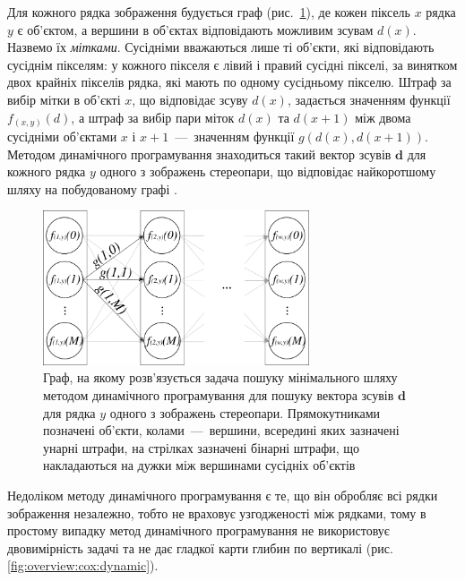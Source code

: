 Для кожного рядка зображення будується граф
(рис.~\ref{fig:dynamic:programming:graph}),
де кожен піксель $x$ рядка $y$ є об'єктом,
а вершини в об'єктах відповідають можливим зсувам $d \left(x \right)$.
Назвемо їх \textit{мітками}.
Сусідніми вважаються лише ті об'єкти, які відповідають сусіднім пікселям:
у кожного пікселя є лівий і правий сусідні пікселі,
за винятком двох крайніх пікселів рядка, які мають по одному сусідньому пікселю.
Штраф за вибір мітки в об'єкті $x$, що відповідає зсуву $d \left(x \right)$,
задається значенням функції $f_{\left( x, y \right)} \left( d \right)$,
а штраф за вибір пари міток $d \left(x \right)$ та $d \left(x + 1 \right)$
між двома сусідніми об'єктами $x$ і $x + 1$~---~значенням функції
$g \left( d \left(x \right), d \left( x + 1 \right) \right)$.
Методом динамічного програмування знаходиться
такий вектор зсувів $\pmb{d}$ для кожного рядка $y$
одного з зображень стереопари,
що відповідає найкоротшому шляху на побудованому графі
\cite{overview:cox:dynamic}.

\begin{figure}[h]
  \centering
  \includegraphics[width=0.7\textwidth]{images/dynamic_programming_graph}
  \caption{Граф, на якому розв'язується задача пошуку мінімального
           шляху методом динамічного програмування для пошуку вектора зсувів
           $\pmb{d}$ для рядка $y$ одного з зображень стереопари.
           Прямокутниками позначені об'єкти, колами~---~вершини,
           всередині яких зазначені унарні штрафи,
           на стрілках зазначені бінарні штрафи,
           що накладаються на дужки між вершинами сусідніх об'єктів}
  \label{fig:dynamic:programming:graph}
\end{figure}

Недоліком методу динамічного програмування є те, що він обробляє всі
рядки зображення незалежно, тобто не враховує узгодженості між рядками,
тому в простому випадку метод динамічного програмування не використовує
двовимірність задачі та не дає гладкої карти
глибин по вертикалі (рис. \ref{fig:overview:cox:dynamic}).

